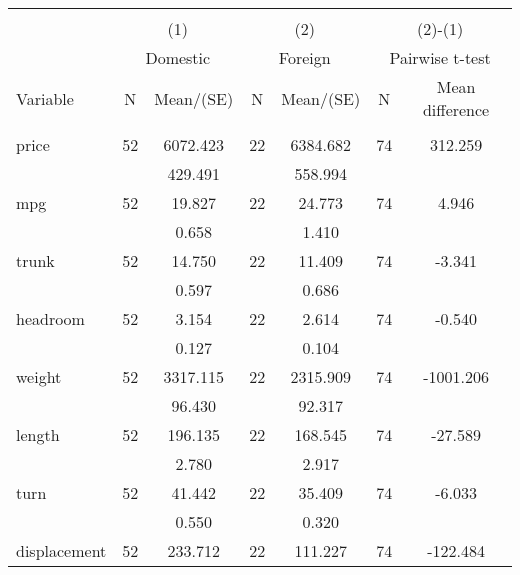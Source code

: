
\begin{tabular}{@{\extracolsep{5pt}}lcccccc}
\\[-1.8ex]\hline \hline \\[-1.8ex]
 & \multicolumn{2}{c}{(1)}  & \multicolumn{2}{c}{(2)}  & \multicolumn{2}{c}{(2)-(1)} \\
 & \multicolumn{2}{c}{Domestic}  & \multicolumn{2}{c}{Foreign}  & \multicolumn{2}{c}{Pairwise t-test}  \\
Variable & N & Mean/(SE) & N & Mean/(SE) & N & Mean difference \\ \hline \\[-1.8ex] 
price   & 52    &  6072.423    & 22    &  6384.682    & 74    &   312.259   \\
 &   &   429.491  &   &   558.994  &   &   \\
mpg   & 52    &    19.827    & 22    &    24.773    & 74    &     4.946   \\
 &   &     0.658  &   &     1.410  &   &   \\
trunk   & 52    &    14.750    & 22    &    11.409    & 74    &    -3.341   \\
 &   &     0.597  &   &     0.686  &   &   \\
headroom   & 52    &     3.154    & 22    &     2.614    & 74    &    -0.540   \\
 &   &     0.127  &   &     0.104  &   &   \\
weight   & 52    &  3317.115    & 22    &  2315.909    & 74    & -1001.206   \\
 &   &    96.430  &   &    92.317  &   &   \\
length   & 52    &   196.135    & 22    &   168.545    & 74    &   -27.589   \\
 &   &     2.780  &   &     2.917  &   &   \\
turn   & 52    &    41.442    & 22    &    35.409    & 74    &    -6.033   \\
 &   &     0.550  &   &     0.320  &   &   \\
displacement   & 52    &   233.712    & 22    &   111.227    & 74    &  -122.484   \\

\end{tabular}

